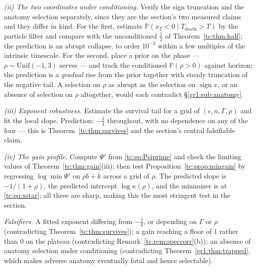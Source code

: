 \documentclass[11pt]{article}
\newcommand{\PrintRefs}{\printbibliography[title={References}]}%
\newcommand{\PrintRefs}{}%
\numberwithin{equation}{section}
\theoremstyle{plain}
\theoremstyle{definition}
\theoremstyle{remark}
\newcommand{\PP}{\mathbb{P}}
\begin{document}
\emph{(ii) The two coordinates under conditioning.} Verify the sign
truncation and the anatomy selection separately, since they are the
section's two measured claims and they differ in kind. For the first,
estimate $\PP(x_T<0\mid T_{\text{death}}>T)$ by the particle filter and
compare with the unconditioned $\tfrac12$ of
Theorem~\ref{tc:thm:half}; the prediction is an abrupt collapse, to
order $10^{-3}$ within a few multiples of the intrinsic timescale. For
the second, place a prior on the phase --- $\rho\sim
\mathrm{Unif}(-1,3)$ serves --- and track the conditioned
$\PP(\rho>0)$ against horizon; the prediction is a \emph{gradual} rise
from the prior together with steady truncation of the negative tail. A
selection on $\rho$ as abrupt as the selection on $\operatorname{sign}
x$, or an absence of selection on $\rho$ altogether, would each
contradict \S\ref{gr1:sub:anatomy}.

\emph{(iii) Exponent robustness.} Estimate the survival tail for a grid
of $(\epsilon,n,\Gamma,\rho)$ and fit the local slope. Prediction:
$-\tfrac14$ throughout, with no dependence on any of the four ---
this is Theorem~\ref{tc:thm:survives} and the section's central
falsifiable claim.

\emph{(iv) The gain profile.} Compute $\Psi'$ from
\eqref{tc:eq:Psiprime} and check the limiting values of
Theorem~\ref{tc:thm:gain}(iii); then test
Proposition~\ref{tc:prop:mingain} by regressing $\log\min\Psi'$ on
$\rho b+k$ across a grid of $\rho$. The predicted slope is
$-1/(1+\rho)$, the
predicted intercept $\log\kappa(\rho)$, and the minimizer is at
\eqref{tc:eq:xstar}; all three are sharp, making this the most stringent
test in the section.

\emph{Falsifiers.} A fitted exponent differing from $-\tfrac14$, or
depending on $\Gamma$ or $\rho$ (contradicting
Theorem~\ref{tc:thm:survives}); a gain reaching a floor of $1$ rather
than $0$ on the plateau (contradicting
Remark~\ref{tc:rem:speccorr}(b)); an absence of anatomy selection under
conditioning (contradicting Theorem~\ref{gr1:thm:trapped}, which makes
adverse anatomy eventually fatal and hence selectable).


\PrintRefs
\end{document}

